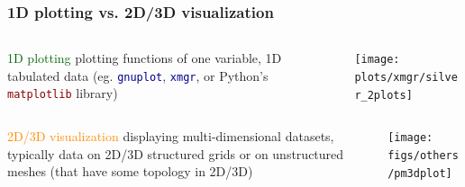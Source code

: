 \begin{frame}

\end{frame}


\begin{frame}
\frametitle{1D plotting vs. 2D/3D visualization}

\begin{columns}
\begin{column}{7cm}
\begin{beamerboxesrounded}[upper=block head,lower=block body,shadow=true]{\textcolor{DarkBlue}{} \textcolor{DarkGreen}{1D plotting}}
         plotting functions of one variable, 1D tabulated data (eg. \textcolor{DarkBlue}{\tt gnuplot},  \textcolor{DarkBlue}{\tt xmgr}, or Python's \textcolor{DarkRed}{\tt matplotlib} library)
\end{beamerboxesrounded}
\end{column}
\begin{column}{5cm}
        \centering
        \texttt{[image: plots/xmgr/silver\_2plots]}
\end{column}
\end{columns}

\begin{columns}
\begin{column}{7cm}
\begin{beamerboxesrounded}[upper=block head,lower=block body,shadow=true]{\textcolor{DarkBlue}{} \textcolor{DarkOrange}{2D/3D visualization} }
        displaying multi-dimensional datasets, typically
data on 2D/3D structured grids or on unstructured meshes (that have
some topology in 2D/3D)
\end{beamerboxesrounded}
\end{column}
\begin{column}{5cm}
        \texttt{[image: figs/others/pm3dplot]}
\end{column}
\end{columns}


\end{frame}
